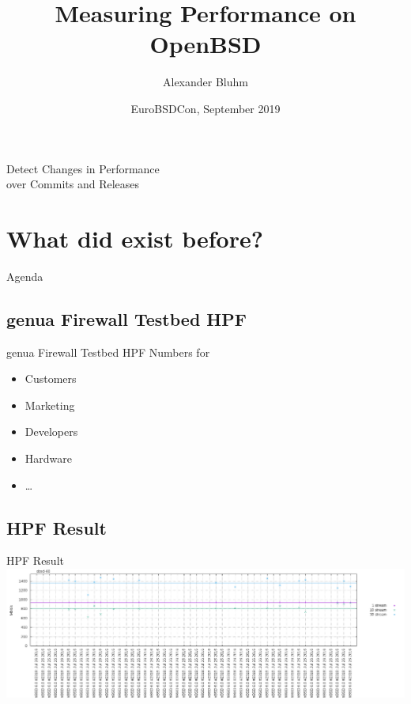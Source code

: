 \documentclass[14pt,aspectratio=169]{beamer}
\author{Alexander Bluhm}
\title{Measuring Performance on OpenBSD}
\institute{bluhm@openbsd.org}
\date{EuroBSDCon, September 2019}
\begin{document}
\begin{frame}
\titlepage
\end{frame}

\begin{frame}{Detect Changes in Performance\\over Commits and Releases}
\setcounter{tocdepth}{1}
\tableofcontents
\end{frame}

\section{What did exist before?}

\begin{frame}{Agenda}
\setcounter{tocdepth}{1}
\tableofcontents[currentsection]
\end{frame}

\subsection{genua Firewall Testbed HPF}
\begin{frame}{genua Firewall Testbed HPF}
Numbers for
\begin{itemize}
    \item Customers
    \item Marketing
    \item Developers
    \item Hardware
    \item \dots
\end{itemize}
\end{frame}

\subsection{HPF Result}
\begin{frame}{HPF Result}
    \includegraphics[width=\textwidth]{images/gs700r7_obsd_proxy_tcp.png}
\end{frame}
\end{document}
